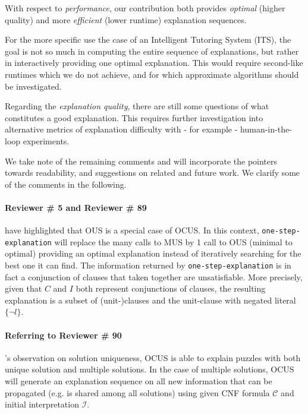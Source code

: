 \documentclass{article}
\begin{document}
With respect to \textit{performance}, our contribution both provides \textit{optimal} (higher quality) and more \textit{efficient} (lower runtime) explanation sequences.

For the more specific use the case of an Intelligent Tutoring System (ITS), the goal is not so much in computing the entire sequence of explanations, but rather in interactively providing one optimal explanation. %
This would require second-like runtimes which we do not achieve, and for which approximate algorithms should be investigated.

Regarding the \textit{explanation quality}, there are still some questions of what constitutes a good explanation. This requires further investigation into alternative metrics of explanation difficulty with - for example - human-in-the-loop experiments.%

\vspace{2em}
\noindent We take note of the remaining comments and will incorporate the pointers towards readability, and suggestions on related and future work. We clarify some of the comments in the following. 


\paragraph{Reviewer \# 5 and Reviewer \# 89} have highlighted that OUS is a special case of OCUS. In this context, \texttt{one-step-explanation} will replace the many calls to MUS by 1 call to OUS (minimal to optimal) providing an optimal explanation instead of iteratively searching for the best one it can find. 
The information returned by \texttt{one-step-explanation} is in fact a conjunction of clauses that taken together are unsatisfiable. More precisely, given that $C$ and $I$ both represent conjunctions of clauses, the resulting explanation is a subset of (unit-)clauses and the unit-clause with negated literal $\{\lnot l \}$.

\paragraph{Referring to Reviewer \# 90}'s observation on solution uniqueness, OCUS is able to explain puzzles with both unique solution and multiple solutions. In the case of multiple solutions, OCUS will generate an explanation sequence on all new information that can be propagated (e.g. is shared among all solutions) using given CNF formula $\mathcal{C}$ and initial interpretation $\mathcal{I}$.
\end{document}
